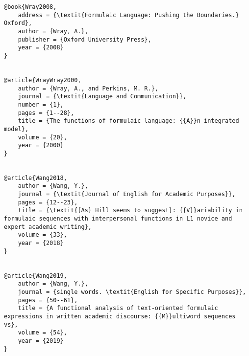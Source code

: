 \begin{verbatim}
@book{Wray2008,
	address = {\textit{Formulaic Language: Pushing the Boundaries.} Oxford},
	author = {Wray, A.},
	publisher = {Oxford University Press},
	year = {2008}
}


@article{WrayWray2000,
	author = {Wray, A., and Perkins, M. R.},
	journal = {\textit{Language and Communication}},
	number = {1},
	pages = {1--28},
	title = {The functions of formulaic language: {{A}}n integrated model},
	volume = {20},
	year = {2000}
}


@article{Wang2018,
	author = {Wang, Y.},
	journal = {\textit{Journal of English for Academic Purposes}},
	pages = {12--23},
	title = {\textit{{As} Hill seems to suggest}: {{V}}ariability in formulaic sequences with interpersonal functions in L1 novice and expert academic writing},
	volume = {33},
	year = {2018}
}


@article{Wang2019,
	author = {Wang, Y.},
	journal = {single words. \textit{English for Specific Purposes}},
	pages = {50--61},
	title = {A functional analysis of text-oriented formulaic expressions in written academic discourse: {{M}}ultiword sequences vs},
	volume = {54},
	year = {2019}
}


\end{verbatim}